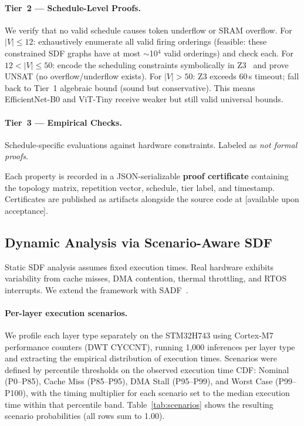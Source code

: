 \documentclass[journal]{IEEEtran}
\begin{document}
\paragraph{Tier~2 --- Schedule-Level Proofs.}
We verify that no valid schedule causes token underflow or SRAM overflow.
For $|V| \leq 12$: exhaustively enumerate all valid firing orderings (feasible: these constrained SDF graphs have at most $\sim$10$^4$ valid orderings) and check each.
For $12 < |V| \leq 50$: encode the scheduling constraints symbolically in Z3~\cite{demoura2008z3} and prove UNSAT (no overflow/underflow exists).
For $|V| > 50$: Z3 exceeds 60\,s timeout; fall back to Tier~1 algebraic bound (sound but conservative).
This means EfficientNet-B0 and ViT-Tiny receive weaker but still valid universal bounds.

\paragraph{Tier~3 --- Empirical Checks.}
Schedule-specific evaluations against hardware constraints. Labeled as \emph{not formal proofs}.

Each property is recorded in a JSON-serializable \textbf{proof certificate} containing the topology matrix, repetition vector, schedule, tier label, and timestamp.
Certificates are published as artifacts alongside the source code at [available upon acceptance].

\subsection{Dynamic Analysis via Scenario-Aware SDF}
\label{sec:sadf}

Static SDF analysis assumes fixed execution times.
Real hardware exhibits variability from cache misses, DMA contention, thermal throttling, and RTOS interrupts.
We extend the framework with SADF~\cite{geilen2010sadf}.

\paragraph{Per-layer execution scenarios.}
We profile each layer type separately on the STM32H743 using Cortex-M7 performance counters (DWT CYCCNT), running 1{,}000 inferences per layer type and extracting the empirical distribution of execution times.
Scenarios were defined by percentile thresholds on the observed execution time CDF: Nominal (P0--P85), Cache Miss (P85--P95), DMA Stall (P95--P99), and Worst Case (P99--P100), with the timing multiplier for each scenario set to the median execution time within that percentile band.
Table~\ref{tab:scenarios} shows the resulting scenario probabilities (all rows sum to 1.00).
\end{document}
